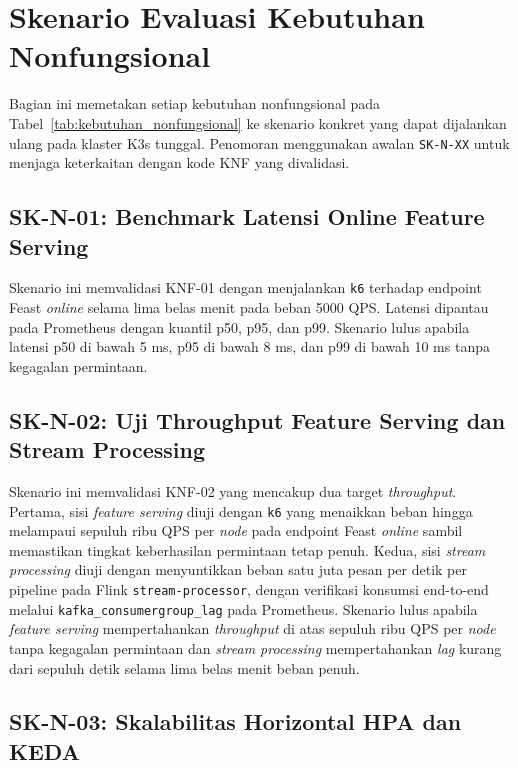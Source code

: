 \section{Skenario Evaluasi Kebutuhan Nonfungsional}
\label{sec:skenario_knf}

Bagian ini memetakan setiap kebutuhan nonfungsional pada Tabel~\ref{tab:kebutuhan_nonfungsional} ke skenario konkret yang dapat dijalankan ulang pada klaster K3s tunggal. Penomoran menggunakan awalan \texttt{SK-N-XX} untuk menjaga keterkaitan dengan kode KNF yang divalidasi.

\subsection{SK-N-01: Benchmark Latensi Online Feature Serving}

Skenario ini memvalidasi KNF-01 dengan menjalankan \texttt{k6} terhadap endpoint Feast \textit{online} selama lima belas menit pada beban 5000 QPS. Latensi dipantau pada Prometheus dengan kuantil p50, p95, dan p99. Skenario lulus apabila latensi p50 di bawah 5 ms, p95 di bawah 8 ms, dan p99 di bawah 10 ms tanpa kegagalan permintaan.

\subsection{SK-N-02: Uji Throughput Feature Serving dan Stream Processing}

Skenario ini memvalidasi KNF-02 yang mencakup dua target \textit{throughput}. Pertama, sisi \textit{feature serving} diuji dengan \texttt{k6} yang menaikkan beban hingga melampaui sepuluh ribu QPS per \textit{node} pada endpoint Feast \textit{online} sambil memastikan tingkat keberhasilan permintaan tetap penuh. Kedua, sisi \textit{stream processing} diuji dengan menyuntikkan beban satu juta pesan per detik per pipeline pada Flink \texttt{stream-processor}, dengan verifikasi konsumsi end-to-end melalui \texttt{kafka\_consumergroup\_lag} pada Prometheus. Skenario lulus apabila \textit{feature serving} mempertahankan \textit{throughput} di atas sepuluh ribu QPS per \textit{node} tanpa kegagalan permintaan dan \textit{stream processing} mempertahankan \textit{lag} kurang dari sepuluh detik selama lima belas menit beban penuh.

\subsection{SK-N-03: Skalabilitas Horizontal HPA dan KEDA}

